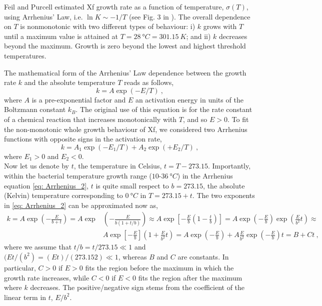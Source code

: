 Feil and Purcell estimated Xf growth rate as a function of temperature,
$\sigma(T)$, using Arrhenius’ Law, i.e. $\ln K \sim -1/T$ (see Fig. 3 in
\cite{Feil2001}). The overall dependence on $T$ is nonmonotonic with two
different types of behaviour: i) $k$ grows with $T$ until a maximum value is
attained at $T=\SI{28}{\degree C}=\SI{301.15}{K}$; and ii) $k$ decreases beyond
the maximum. Growth is zero beyond the lowest and highest threshold
temperatures.

The mathematical form of the Arrhenius' Law dependence between the growth
rate $k$ and the absolute temperature $T$ reads as follows,
\begin{equation}
    k = A \exp(-E/T) \ ,
\end{equation}
where $A$ is a pre-exponential factor and $E$ an activation energy in units
of the Boltzmann constant $k_B$. The original use of this equation is for the
rate constant of a chemical reaction that increases monotonically with $T$, and
so $E>0$.  To fit the non-monotonic whole growth behaviour of Xf, we considered
two Arrhenius functions with opposite signs in the activation rate,
\begin{equation}\label{eq: Arrhenius_2}
    k =A_1 \exp(-E_1/T) + A_2 \exp(+E_2/T) \ ,
\end{equation}
where $E_1>0$ and $E_2<0$.\\

Now let us denote by $t$, the temperature in Celsius, $t= T-273.15$.
Importantly, within the bacterial temperature growth range
($10$-$\SI{36}{\degree C}$) in the Arrhenius equation \cref{eq: Arrhenius_2},
$t$ is quite small respect to $b = 273.15$, the absolute (Kelvin) temperature
corresponding to $\SI{0}{\degree C}$ in $T = 273.15 + t$. The two exponents in
\cref{eq: Arrhenius_2} can be approximated now as,
\begin{equation}
    \begin{aligned}
        k=A \exp \left(-\frac{E}{b+t}\right)=A \exp & \left(-\frac{E}{b(1+t /
                b)}\right) \approx A \exp
        \left[-\frac{E}{b}\left(1-\frac{t}{b}\right)\right]=A
        \exp \left(-\frac{E}{b}\right) \exp \left(\frac{E}{b^{2}} t\right)
        \approx
        \\
                                                    & A \exp
        \left[-\frac{E}{b}\right]\left(1+\frac{E}{b^{2}} t\right)=A
        \exp \left(-\frac{E}{b}\right)+A \frac{E}{b^{2}} \exp
        \left(-\frac{E}{b}\right)
        t=B+C t \ ,
    \end{aligned}
    \label{eq:tempapprox}
\end{equation}
where we assume that $t/b = t/273.15 \ll1$ and	$(Et/(b^2) = (Et)/(273.152)
    \ll1$, whereas $B$ and $C$ are constants. In particular, $C>0$ if $E>0$
fits
the region before the maximum in which the growth rate increases, while $C<0$
if $E<0$ fits the region after the maximum where $k$ decreases. The
positive/negative sign stems from the coefficient of the linear term in $t$,
$E/b^2$.

